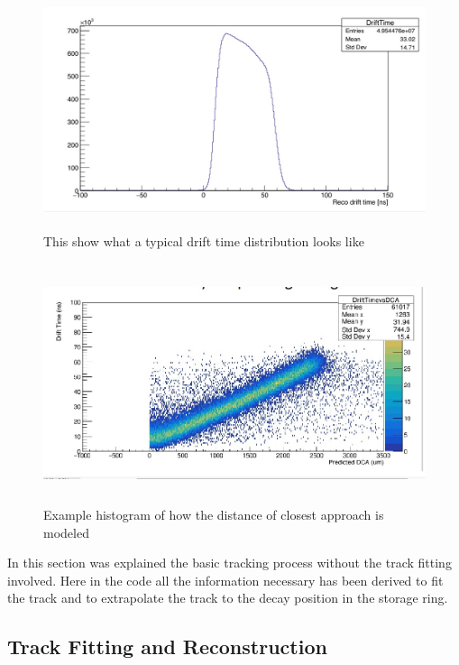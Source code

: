 \documentclass[./Thesis]{subfiles}
\begin{document}
	
\begin{figure}
	\centerline{\includegraphics[height=70mm]{drifttimedist.jpeg}}
	\caption[Drift Time Distibution]{ This show what a typical drift time distribution looks like	}
	\label{fig:drifttimedist}
\end{figure} 

\begin{figure}
	\centerline{\includegraphics[height=70mm]{driftdca.jpeg}}
	\caption[Drift Time Distibution vs. The distance of closest approach]{ Example histogram of how the distance of closest approach is modeled	}
	\label{fig:driftdca}
\end{figure} 



	In this section was explained the basic tracking process without the track fitting involved. Here in the code all the information necessary has been derived to fit the track and to extrapolate the track to the decay position in the storage ring.

\subsection{Track Fitting and Reconstruction}
\end{document}
